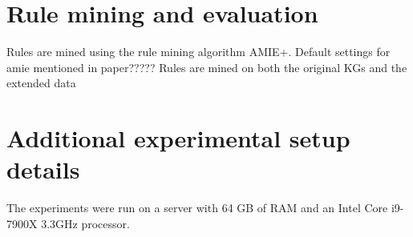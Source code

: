 \section{Rule mining and evaluation}
Rules are mined using the rule mining algorithm AMIE+. Default settings for amie mentioned in paper?????
Rules are mined on both the original KGs and the extended data


\section{Additional experimental setup details}
The experiments were run on a server with 64 GB of RAM and an Intel Core i9-7900X 3.3GHz processor.
